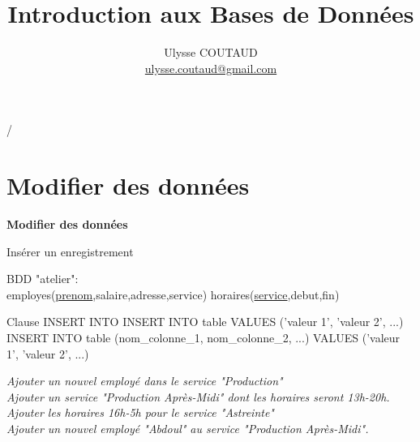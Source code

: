 \documentclass[xetex,dvipsnames]{beamer}
\begin{document}
\title{Introduction aux Bases de Données}

 {   \hspace{1em} \insertframenumber/\inserttotalframenumber }

\author{Ulysse COUTAUD\\\href{mailto:ulysse.coutaud@gmail.com}{\small ulysse.coutaud@gmail.com}}
\date{}
	
\maketitle

\section{Modifier des données}
\begin{frame}
\begin{center}
{\LARGE \textbf{Modifier des données}}
\end{center}
\end{frame}

\begin{frame}[t]{Insérer un enregistrement}
\begin{small}
		BDD "atelier": \\employes(\underline{prenom},salaire,adresse,service) horaires(\underline{service},debut,fin)
\end{small}	
	\begin{alertblock}{Clause INSERT INTO}
	INSERT INTO table VALUES ('valeur 1', 'valeur 2', ...)\\
	INSERT INTO table (nom\_colonne\_1, nom\_colonne\_2, ...) VALUES ('valeur 1', 'valeur 2', ...)
	\end{alertblock}
		
	\textit{Ajouter un nouvel employé dans le service "Production"}\\
	\textit{Ajouter un service "Production Après-Midi" dont les horaires seront 13h-20h.}\\
	\textit{Ajouter les horaires 16h-5h pour le service "Astreinte"}\\
	\textit{Ajouter un nouvel employé "Abdoul" au service "Production Après-Midi".}\\
\end{frame}
\end{document}
